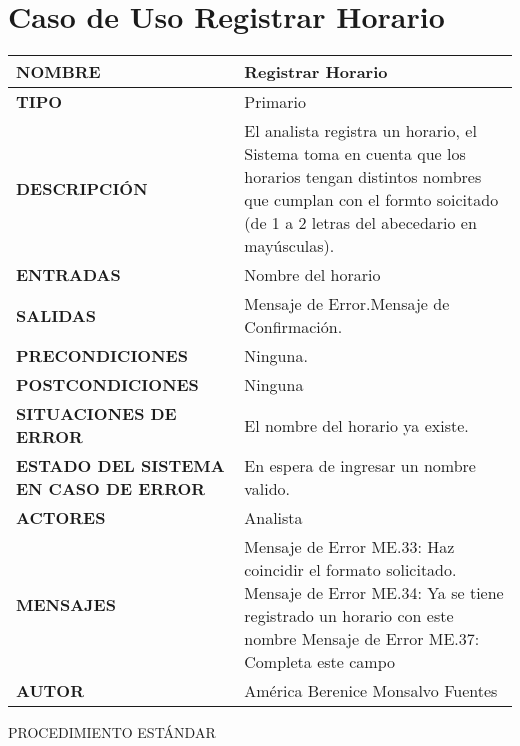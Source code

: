 \newpage
\section{Caso de Uso Registrar Horario}
\begin{longtable}{ | p{6cm} | p{10cm} |}
	\hline
	\textbf{NOMBRE} & Registrar Horario\\
	\hline
	\textbf{TIPO} & Primario\\
	\hline
	\textbf{DESCRIPCIÓN} & El analista registra un horario, el Sistema toma en cuenta  que los horarios tengan distintos nombres que cumplan con el formto soicitado (de 1 a 2 letras del abecedario en mayúsculas).\\
	\hline
	\textbf{ENTRADAS} & Nombre del horario\\
	\hline
	\textbf{SALIDAS} & Mensaje de Error.\newline Mensaje de Confirmación.\\
	\hline
	\textbf{PRECONDICIONES} & Ninguna.\\
	\hline
	\textbf{POSTCONDICIONES} & Ninguna\\
	\hline
	\textbf{SITUACIONES DE ERROR} 
	&
	El nombre del horario ya existe.\\
	\hline
	\textbf{ESTADO DEL SISTEMA EN CASO DE ERROR} & En espera de ingresar un nombre valido.\\
	\hline
	\textbf{ACTORES} & Analista\\
	\hline
	\textbf{MENSAJES} 
	&
	Mensaje de Error ME.33: Haz coincidir el formato solicitado.\newline
	Mensaje de Error ME.34: Ya se tiene registrado un horario con este nombre\newline
	Mensaje de Error ME.37: Completa este campo\\
	\hline
	\textbf{AUTOR} & América Berenice Monsalvo Fuentes\\
	\hline
\end{longtable}
\vspace*{1cm}
\noindent
\Large{PROCEDIMIENTO ESTÁNDAR}
\large{}
